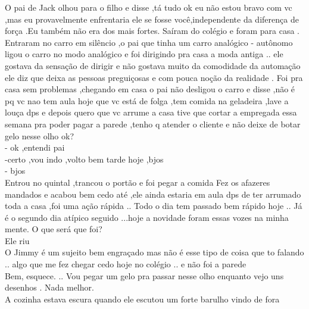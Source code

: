 \documentclass{book}
\begin{document}
O pai de Jack olhou para o filho e disse ,tá tudo ok eu não estou bravo com vc ,mas eu provavelmente enfrentaria ele se fosse você,independente da diferença de força .Eu também não era dos mais fortes.
Saíram do colégio e foram para casa .\\
Entraram no carro em silêncio ,o pai que tinha um carro analógico - autônomo ligou o carro no modo analógico e foi dirigindo pra casa a moda antiga .. ele gostava da sensação de dirigir e não gostava muito da comodidade da automação ele diz que deixa as pessoas preguiçosas e com pouca noção da realidade . Foi pra casa sem problemas ,chegando em casa o pai não desligou o carro e disse ,não é pq vc nao tem aula hoje que vc está de folga ,tem comida na geladeira ,lave a louça dps e depois quero que vc arrume a casa tive que cortar a empregada essa semana pra poder pagar a parede ,tenho q atender o cliente e não deixe de botar gelo nesse olho ok? \\
- ok ,entendi pai \\
-certo ,vou indo ,volto bem tarde hoje ,bjos\\
- bjos\\
Entrou no quintal ,trancou o portão e foi pegar a comida 
Fez os afazeres mandados e acabou bem cedo até ,ele ainda estaria em aula dps de ter arrumado toda a casa ,foi uma ação rápida .. Todo o dia tem passado bem rápido hoje .. Já é o segundo dia atípico seguido ...hoje a novidade foram essas vozes na minha mente. O que será que foi?\\

Ele riu \\
O Jimmy é um sujeito bem engraçado mas não é esse tipo de coisa que to falando .. algo que me fez chegar cedo hoje no colégio .. e não foi a parede \\
Bem, esquece. .. Vou pegar um gelo pra passar nesse olho enquanto vejo uns desenhos . Nada melhor.\\
A cozinha estava escura quando ele escutou um forte barulho vindo de fora \\
\end{document}
